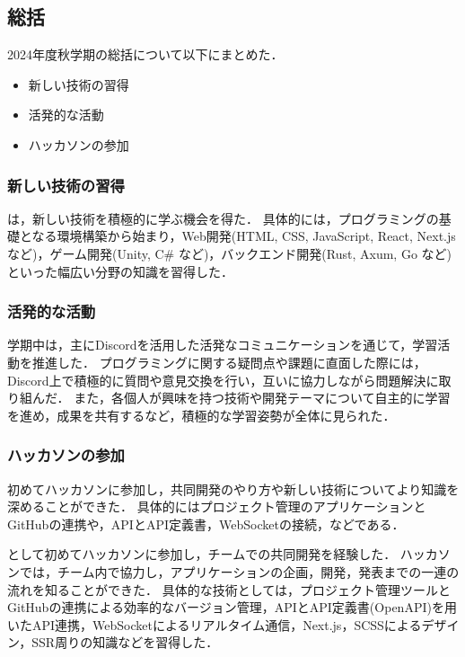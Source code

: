 \subsection*{\firstGrade{}総括}


2024年度秋学期の\firstGrade{}総括について以下にまとめた．

\begin{itemize}
	\item 新しい技術の習得
	\item 活発的な活動
	\item ハッカソンの参加
\end{itemize}

\subsubsection*{新しい技術の習得}

\firstGrade{}は，新しい技術を積極的に学ぶ機会を得た．
具体的には，プログラミングの基礎となる環境構築から始まり，Web開発(HTML, CSS, JavaScript, React, Next.js など)，ゲーム開発(Unity, C# など)，バックエンド開発(Rust, Axum, Go など)といった幅広い分野の知識を習得した．

\subsubsection*{活発的な活動}

学期中は，主にDiscordを活用した活発なコミュニケーションを通じて，学習活動を推進した．
プログラミングに関する疑問点や課題に直面した際には，Discord上で積極的に質問や意見交換を行い，互いに協力しながら問題解決に取り組んだ．
また，各個人が興味を持つ技術や開発テーマについて自主的に学習を進め，成果を共有するなど，積極的な学習姿勢が全体に見られた．

\subsubsection*{ハッカソンの参加}
初めてハッカソンに参加し，共同開発のやり方や新しい技術についてより知識を深めることができた．
具体的にはプロジェクト管理のアプリケーションとGitHubの連携や，APIとAPI定義書，WebSocketの接続，などである．

\firstGrade{}として初めてハッカソンに参加し，チームでの共同開発を経験した．
ハッカソンでは，チーム内で協力し，アプリケーションの企画，開発，発表までの一連の流れを知ることができた．
具体的な技術としては，プロジェクト管理ツールとGitHubの連携による効率的なバージョン管理，APIとAPI定義書(OpenAPI)を用いたAPI連携，WebSocketによるリアルタイム通信，Next.js，SCSSによるデザイン，SSR周りの知識などを習得した．
